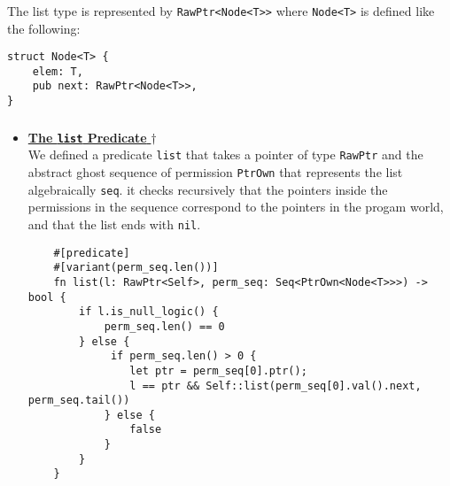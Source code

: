 \documentclass[11pt,a4paper]{article}
\begin{document}
\subsubsection{}
The list type is represented by \texttt{RawPtr<Node<T>>} where \texttt{Node<T>} is defined like the following:
\begin{verbatim}
struct Node<T> {
    elem: T,
    pub next: RawPtr<Node<T>>,
}
\end{verbatim}

\subsubsection{}
\begin{itemize}
    \item  \hyperlink{list}{\textbf{The \texttt{list} Predicate}
      $\dagger$}\\
        We defined a predicate \texttt{list} that takes a pointer of type \texttt{RawPtr} and the abstract ghost sequence of permission \texttt{PtrOwn} that represents the list algebraically \texttt{seq}. it checks recursively that the pointers inside the permissions in the sequence correspond to the pointers in the progam world, and that the list ends with \texttt{nil}.\\
    \begin{verbatim}
    #[predicate]
    #[variant(perm_seq.len())]
    fn list(l: RawPtr<Self>, perm_seq: Seq<PtrOwn<Node<T>>>) -> bool {
        if l.is_null_logic() {
            perm_seq.len() == 0
        } else {
             if perm_seq.len() > 0 {
                let ptr = perm_seq[0].ptr();
                l == ptr && Self::list(perm_seq[0].val().next, perm_seq.tail())
            } else {
                false
            }
        }
    }
    \end{verbatim}
    
  \begin{figure}[tp]
    \centering
\end{figure}
\end{itemize}
\end{document}
